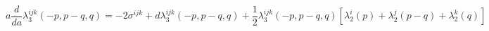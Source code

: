 \begin{equation}
a \frac {d} {da} \lambda_3^{ijk}(-p,p-q,q) =-2 \sigma^{ijk}+d
\lambda_3^{ijk}(-p,p-q,q)+\frac 1 2 \lambda_3^{ijk}
(-p,p-q,q)[\lambda_2^i(p)+\lambda_2^j(p-q)+\lambda_2^k(q)]
\label{threepoint}
\end{equation}

